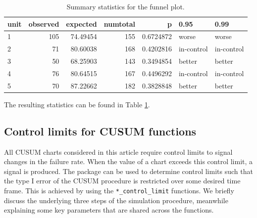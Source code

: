 \begin{table}

\caption{\label{tab:summaryfunnel-static}Summary statistics for the funnel plot.}
\centering
\begin{tabular}[t]{l|r|r|r|r|l|l}
\hline
unit & observed & expected & numtotal & p & 0.95 & 0.99\\
\hline
1 & 105 & 74.49454 & 155 & 0.6724872 & worse & worse\\
\hline
2 & 71 & 80.60038 & 168 & 0.4202816 & in-control & in-control\\
\hline
3 & 50 & 68.25903 & 143 & 0.3494854 & better & better\\
\hline
4 & 76 & 80.64515 & 167 & 0.4496292 & in-control & in-control\\
\hline
5 & 70 & 87.22662 & 182 & 0.3828848 & better & better\\
\hline
\end{tabular}
\end{table}

The resulting statistics can be found in Table \ref{tab:summaryfunnel-static}.

\hypertarget{sec:controllimitscusum}{%
\subsection{Control limits for CUSUM functions}\label{sec:controllimitscusum}}

All CUSUM charts considered in this article require control limits to signal changes in the failure rate. When the value of a chart exceeds this control limit, a signal is produced. The  package can be used to determine control limits such that the type I error of the CUSUM procedure is restricted over some desired time frame. This is achieved by using the \texttt{*\_control\_limit} functions. We briefly discuss the underlying three steps of the simulation procedure, meanwhile explaining some key parameters that are shared across the functions.

